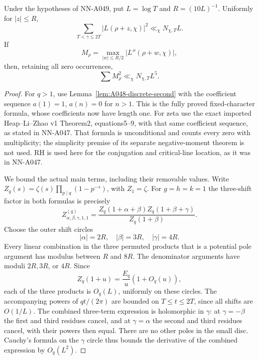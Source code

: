 \begin{lemma}
\label{lem:A049-curvature-mean}
Under the hypotheses of NN-A049, put \(L=\log T\) and
\(R=(10L)^{-1}\). Uniformly for \(|z|\le R\),
\begin{equation}\label{eq:A049-small-shift-mean}
 \sum_{T<\gamma\le2T}|L(\rho+z,\chi)|^2
                                  \ll_\chi N_{\chi,T}L.
\end{equation}
If
\[
 M_\rho=\max_{|w|\le R/2}|L''(\rho+w,\chi)|,
\]
then, retaining all zero occurrences,
\begin{equation}\label{eq:A049-curvature-mean}
                     \sum M_\rho^2\ll_\chi N_{\chi,T}L^5.
\end{equation}
\end{lemma}

\begin{proof}
For \(q>1\), use Lemma~\ref{lem:A048-discrete-second}
with the coefficient sequence \(a(1)=1\), \(a(n)=0\)
for \(n>1\). This is the fully proved fixed-character
formula, whose coefficients now have length one.
For zeta use the exact imported Heap--Li--Zhao v1
Theorem2, equations5--9, with that same coefficient
sequence, as stated in NN-A047. That formula is
unconditional and counts every zero with multiplicity;
the simplicity premise of its separate negative-moment
theorem is not used. RH is used here for the conjugation
and critical-line location, as it was in NN-A047.

We bound the actual main terms, including their removable
values. Write \(Z_q(s)=\zeta(s)\prod_{p\mid q}(1-p^{-s})\),
with \(Z_1=\zeta\). For \(g=h=k=1\) the three-shift factor
in both formulas is precisely
\[
 Z^{(q)}_{\alpha,\beta,\gamma,1,1}
   =\frac{Z_q(1+\alpha+\beta)Z_q(1+\beta+\gamma)}
           {Z_q(1+\beta)}.
\]
Choose the outer shift circles
\[
                  |\alpha|=2R,\quad|\beta|=3R,\quad|\gamma|=4R.
\]
Every linear combination in the three permuted products
that is a potential pole argument has modulus between
\(R\) and \(8R\). The denominator arguments have moduli
\(2R,3R\), or \(4R\). Since
\[
 Z_q(1+u)=\frac{E_q}{u}(1+O_q(u)),
\]
each of the three products is \(O_q(L)\), uniformly on
these circles. The accompanying powers of \(qt/(2\pi)\)
are bounded on \(T\le t\le2T\), since all shifts are
\(O(1/L)\). The combined three-term expression is
holomorphic in \(\gamma\): at \(\gamma=-\beta\) the first
and third residues cancel, and at \(\gamma=\alpha\) the
second and third residues cancel, with their powers then
equal. There are no other poles in the small disc.
Cauchy's formula on the \(\gamma\) circle thus bounds
the derivative of the combined expression by \(O_q(L^2)\).


\end{proof}
